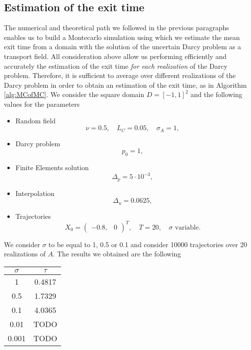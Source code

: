 \subsection{Estimation of the exit time}

The numerical and theoretical path we followed in the previous paragraphs enables us to build a Montecarlo simulation using which we estimate the mean exit time from a domain with the solution of the uncertain Darcy problem as a transport field. All consideration above allow us performing efficiently and accurately the estimation of the exit time \textit{for each realization} of the Darcy problem. Therefore, it is sufficient to average over different realizations of the Darcy problem in order to obtain an estimation of the exit time, as in Algorithm \ref{alg:MCofMC}. We consider the square domain $D = [-1, 1]^2$ and the following values for the parameters
\begin{itemize}
	\item Random field
	\begin{equation*}
		\nu = 0.5, \quad L_C = 0.05, \quad \sigma_A = 1,
	\end{equation*}
	\item Darcy problem
	\begin{equation*}
		p_0 = 1,
	\end{equation*}
	\item Finite Elements solution
	\begin{equation*}
		\Delta_p = 5\cdot 10^{-3},
	\end{equation*}
	\item Interpolation
	\begin{equation*}
		\Delta_u = 0.0625,
	\end{equation*}
	\item Trajectories
	\begin{equation*}
		X_0 = \begin{pmatrix} -0.8, & 0 \end{pmatrix}^T, \quad T = 20, \quad \sigma \text{ variable}.
	\end{equation*}
\end{itemize}

\noindent We consider $\sigma$ to be equal to 1, 0.5 or 0.1 and consider 10000 trajectories over 20 realizations of $A$. The results we obtained are the following 

\begin{center}
 	\begin{tabular}{|c c|} 
 	\hline
 	$\sigma$ & $\tau$ \\ [0.5ex] 
 	\hline\hline
	1 & 0.4817 \\ 
 	\hline
 	0.5 & 1.7329 \\
 	\hline
 	0.1 & 4.0365 \\
 	\hline
	0.01 & TODO \\
	\hline
	0.001 & TODO \\
	\hline
\end{tabular}
\end{center}



